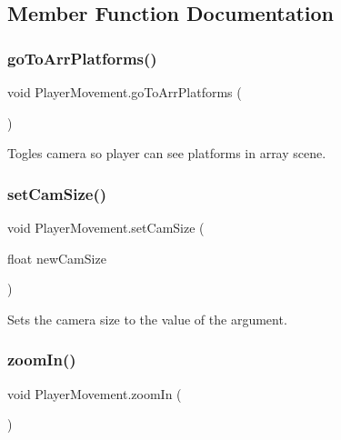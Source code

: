 \subsection{Member Function Documentation}
\mbox{\label{class_player_movement_abd415fe1fd1e33f5fe5c28fa9ad97399}} 
\subsubsection{\texorpdfstring{go\+To\+Arr\+Platforms()}{goToArrPlatforms()}}
{\footnotesize\ttfamily void Player\+Movement.\+go\+To\+Arr\+Platforms (\begin{DoxyParamCaption}{ }\end{DoxyParamCaption})}



Togles camera so player can see platforms in array scene. 

\mbox{\label{class_player_movement_a53e0613db4bf57eb5edc2b9dacd7bfe5}} 
\subsubsection{\texorpdfstring{set\+Cam\+Size()}{setCamSize()}}
{\footnotesize\ttfamily void Player\+Movement.\+set\+Cam\+Size (\begin{DoxyParamCaption}\item[{float}]{new\+Cam\+Size }\end{DoxyParamCaption})}



Sets the camera size to the value of the argument. 

\mbox{\label{class_player_movement_a86dee8b90e483c36b7190c80a53a4163}} 
\subsubsection{\texorpdfstring{zoom\+In()}{zoomIn()}}
{\footnotesize\ttfamily void Player\+Movement.\+zoom\+In (\begin{DoxyParamCaption}{ }\end{DoxyParamCaption})}



